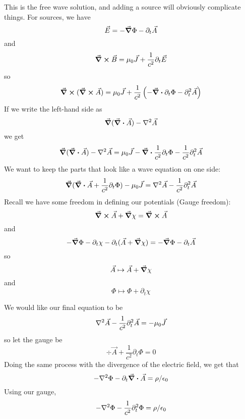 \documentclass[a4paper,twoside,master.tex]{subfiles}
\begin{document}
This is the free wave solution, and adding a source will obviously complicate things. For sources, we have
\begin{equation}
    \vec{E} = - \grad{\Phi} - \partial_t \vec{A}
\end{equation}
and
\begin{equation}
    \curl{ \vec{B}} = \mu_0 \vec{J} + \frac{1}{c^2} \partial_t \vec{E}
\end{equation}
so
\begin{equation}
    \curl{(\curl{ \vec{A}})} = \mu_0 \vec{J} + \frac{1}{c^2} \left( - \div{\partial_t\Phi} - \partial_t^2 \vec{A} \right)
\end{equation}
If we write the left-hand side as
\begin{equation}
    \grad{(\div{ \vec{A}})} - \laplacian{ \vec{A}}
\end{equation}
we get
\begin{equation}
    \grad{(\div{ \vec{A}})} - \laplacian{ \vec{A}} = \mu_0 \vec{J} - \div{\frac{1}{c^2} \partial_t \Phi} - \frac{1}{c^2} \partial_t^2 \vec{A}
\end{equation}
We want to keep the parts that look like a wave equation on one side:
\begin{equation}
    \grad{(\div{ \vec{A}} + \frac{1}{c^2} \partial_t \Phi)} - \mu_0 \vec{J} = \laplacian{ \vec{A}} - \frac{1}{c^2} \partial_t^2 \vec{A}
\end{equation}
Recall we have some freedom in defining our potentials (Gauge freedom):
\begin{equation}
    \curl{ \vec{A} + \grad{\chi}} = \curl{ \vec{A}}
\end{equation}
and
\begin{equation}
    - \grad{\Phi - \partial_t\chi} - \partial_t ( \vec{A} + \grad{\chi}) = - \grad{\Phi} - \partial_t \vec{A}
\end{equation}
so
\begin{equation}
    \vec{A} \mapsto \vec{A} + \grad{\chi}
\end{equation}
and
\begin{equation}
    \Phi \mapsto \Phi + \partial_t \chi
\end{equation}

We would like our final equation to be
\begin{equation}
    \laplacian{ \vec{A}} - \frac{1}{c^2} \partial_t^2 \vec{A} = -\mu_0 \vec{J}
\end{equation}
so let the gauge be
\begin{equation}
    \div{ \vec{A}} + \frac{1}{c^2} \partial_t \Phi = 0
\end{equation}
Doing the same process with the divergence of the electric field, we get that
\begin{equation}
    - \laplacian{\Phi} - \partial_t \div{ \vec{A}} = \rho/\epsilon_0
\end{equation}
Using our gauge,
\begin{equation}
    - \laplacian{\Phi} - \frac{1}{c^2}\partial_t^2 \Phi = \rho/\epsilon_0
\end{equation}
\end{document}
